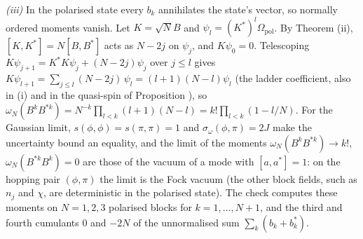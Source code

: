 \emph{(iii)} In the polarised state every $b_{k}$ annihilates the state's vector, so normally ordered moments vanish. Let $K = \sqrt N B$ and $\psi_{l} = (K^{*})^{l}\Omega_{\mathrm{pol}}$. By Theorem (ii), $[K, K^{*}] = N[B, B^{*}]$ acts as $N - 2j$ on $\psi_{j}$, and $K\psi_{0} = 0$. Telescoping $K\psi_{j + 1} = K^{*}K\psi_{j} + (N - 2j)\psi_{j}$ over $j \le l$ gives $K\psi_{l + 1} = \sum_{j \le l}(N - 2j)\,\psi_{l} = (l + 1)(N - l)\psi_{l}$ (the ladder coefficient, also in (i) and in the quasi-spin of Proposition ), so $\omega_{N}(B^{k}B^{*k}) = N^{-k}\prod_{l < k}(l + 1)(N - l) = k!\prod_{l < k}(1 - l/N)$. For the Gaussian limit, $s(\phi, \phi) = s(\pi, \pi) = 1$ and $\sigma_{\omega}(\phi, \pi) = 2J$ make the uncertainty bound an equality, and the limit of the moments $\omega_{N}(B^{k}B^{*k}) \to k!$, $\omega_{N}(B^{*k}B^{k}) = 0$ are those of the vacuum of a mode with $[a, a^{*}] = 1$: on the hopping pair $(\phi, \pi)$ the limit is the Fock vacuum (the other block fields, such as $n_{j}$ and $\chi$, are deterministic in the polarised state). The check computes these moments on $N = 1, 2, 3$ polarised blocks for $k = 1, \dots, N + 1$, and the third and fourth cumulants $0$ and $-2N$ of the unnormalised sum $\sum_{k}(b_{k} + b_{k}^{*})$.
